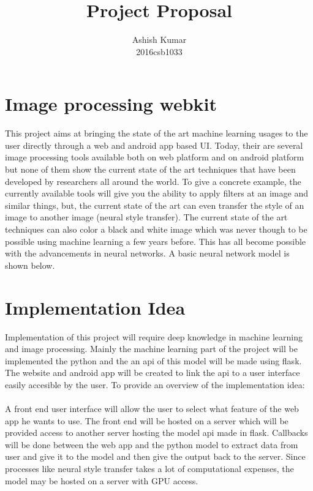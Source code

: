 \documentclass[journal]{IEEEtran}
\begin{document}
\title{Project Proposal}

\author{

Ashish Kumar\\
2016csb1033

}

\maketitle


\section{\textbf{Image processing webkit}}
This project aims at bringing the state of the art machine learning usages to the user directly through a web and android app based UI. Today, their are several image processing tools available both on web platform and on android platform but none of them show the current state of the art techniques that have been developed by researchers all around the world. To give a concrete example, the currently available tools will give you the ability to apply filters at an image and similar things, but, the current state of the art can even transfer the style of an image to another image (neural style transfer). The current state of the art techniques can also color a black and white image which was never though to be possible using machine learning a few years before. This has all become possible with the advancements in neural networks. A basic neural network model is shown below.
\\

\section{Implementation Idea}
Implementation of this project will require deep knowledge in machine learning and image processing. Mainly the machine learning part of the project will be implemented the python and the an api of this model will be made using flask. The website and android app will be created to link the api to a user interface easily accesible by the user. To provide an overview of the implementation idea: 
\\
\\
A front end user interface will allow the user to select what feature of the web app he wants to use. The front end will be hosted on a server which will be provided access to another server hosting the model api made in flask. Callbacks will be done between the web app and the python model to extract data from user and give it to the model and then give the output back to the server. Since processes like neural style transfer takes a lot of computational expenses, the model may be hosted on a server with GPU access.


 
\end{document}
